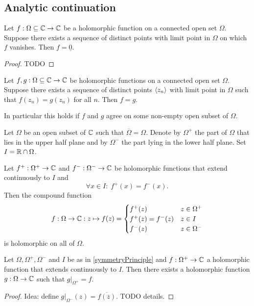 \subsection{Analytic continuation}
\begin{proposition}
Let $f:\Omega\subseteq \mathbb{C}\to \mathbb{C}$ be a holomorphic function on a connected open set $\Omega$. Suppose there exists a sequence of distinct points with limit point in $\Omega$ on which $f$ vanishes. Then $f = \underline{0}$.
\end{proposition}
\begin{proof}
TODO
\end{proof}
\begin{corollary}
Let $f,g:\Omega\subseteq \mathbb{C}\to \mathbb{C}$ be holomorphic functions on a connected open set $\Omega$. Suppose there exists a sequence of distinct points $\left\langle z_n \right\rangle$ with limit point in $\Omega$ such that $f(z_n) = g(z_n)$ for all $n$. Then $f = g$.
\end{corollary}
In particular this holds if $f$ and $g$ agree on some non-empty open subset of $\Omega$.

\begin{proposition} \label{symmetryPrinciple}
Let $\Omega$ be an open subset of $\mathbb{C}$ such that $\overline{\Omega} = \Omega$. Denote by $\Omega^+$ the part of $\Omega$ that lies in the upper half plane and by $\Omega^-$ the part lying in the lower half plane. Set $I = \mathbb{R} \cap \Omega$.

Let $f^+: \Omega^+ \to \mathbb{C}$ and $f^-: \Omega^- \to \mathbb{C}$ be holomorphic functions that extend continuously to $I$ and
\[ \forall x\in I: \; f^+(x) = f^-(x). \]
Then the compound function
\[ f: \Omega \to \mathbb{C}: z\mapsto f(z) = \begin{cases}
f^+(z) & z\in \Omega^+ \\
f^+(z) = f^-(z) & z\in I \\
f^-(z) & z\in \Omega^-
\end{cases} \]
is holomorphic on all of $\Omega$.
\end{proposition}

\begin{proposition}
Let $\Omega, \Omega^+, \Omega^-$ and $I$ be as in \ref{symmetryPrinciple} and $f: \Omega^+ \to \mathbb{C}$ a holomorphic function that extends continuously to $I$. Then there exists a holomorphic function $g: \Omega\to \mathbb{C}$ such that $g|_{\Omega^+} = f$.
\end{proposition}
\begin{proof}
Idea: define $g|_{\Omega^-}(z) = \overline{f(\overline{z})}$. TODO details.
\end{proof}

